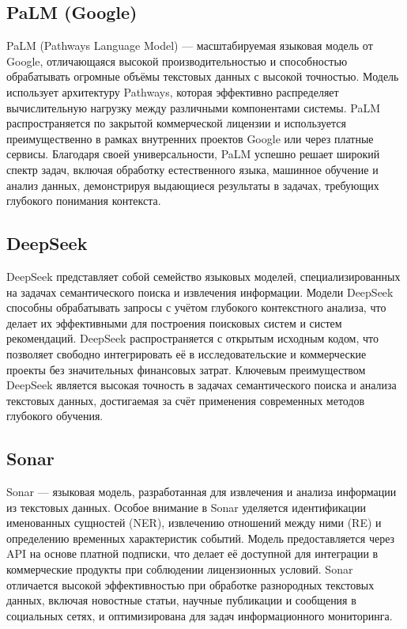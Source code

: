 \subsection{PaLM (Google)}

PaLM (Pathways Language Model) — масштабируемая языковая модель от Google, отличающаяся высокой производительностью и способностью обрабатывать огромные объёмы текстовых данных с высокой точностью. Модель использует архитектуру Pathways, которая эффективно распределяет вычислительную нагрузку между различными компонентами системы. PaLM распространяется по закрытой коммерческой лицензии и используется преимущественно в рамках внутренних проектов Google или через платные сервисы. Благодаря своей универсальности, PaLM успешно решает широкий спектр задач, включая обработку естественного языка, машинное обучение и анализ данных, демонстрируя выдающиеся результаты в задачах, требующих глубокого понимания контекста.

\subsection{DeepSeek}

DeepSeek представляет собой семейство языковых моделей, специализированных на задачах семантического поиска и извлечения информации. Модели DeepSeek способны обрабатывать запросы с учётом глубокого контекстного анализа, что делает их эффективными для построения поисковых систем и систем рекомендаций. DeepSeek распространяется с открытым исходным кодом, что позволяет свободно интегрировать её в исследовательские и коммерческие проекты без значительных финансовых затрат. Ключевым преимуществом DeepSeek является высокая точность в задачах семантического поиска и анализа текстовых данных, достигаемая за счёт применения современных методов глубокого обучения.

\subsection{Sonar}

Sonar — языковая модель, разработанная для извлечения и анализа информации из текстовых данных. Особое внимание в Sonar уделяется идентификации именованных сущностей (NER), извлечению отношений между ними (RE) и определению временных характеристик событий. Модель предоставляется через API на основе платной подписки, что делает её доступной для интеграции в коммерческие продукты при соблюдении лицензионных условий. Sonar отличается высокой эффективностью при обработке разнородных текстовых данных, включая новостные статьи, научные публикации и сообщения в социальных сетях, и оптимизирована для задач информационного мониторинга.

